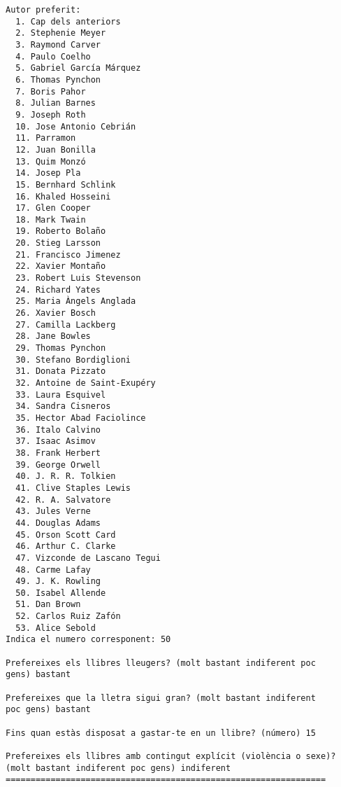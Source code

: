 \begin{verbatim}
Autor preferit: 
  1. Cap dels anteriors
  2. Stephenie Meyer
  3. Raymond Carver
  4. Paulo Coelho
  5. Gabriel García Márquez
  6. Thomas Pynchon
  7. Boris Pahor
  8. Julian Barnes
  9. Joseph Roth
  10. Jose Antonio Cebrián
  11. Parramon
  12. Juan Bonilla
  13. Quim Monzó
  14. Josep Pla
  15. Bernhard Schlink
  16. Khaled Hosseini
  17. Glen Cooper
  18. Mark Twain
  19. Roberto Bolaño
  20. Stieg Larsson
  21. Francisco Jimenez
  22. Xavier Montaño
  23. Robert Luis Stevenson
  24. Richard Yates
  25. Maria Àngels Anglada
  26. Xavier Bosch
  27. Camilla Lackberg
  28. Jane Bowles
  29. Thomas Pynchon
  30. Stefano Bordiglioni
  31. Donata Pizzato
  32. Antoine de Saint-Exupéry
  33. Laura Esquivel
  34. Sandra Cisneros
  35. Hector Abad Faciolince
  36. Italo Calvino
  37. Isaac Asimov
  38. Frank Herbert
  39. George Orwell
  40. J. R. R. Tolkien
  41. Clive Staples Lewis
  42. R. A. Salvatore
  43. Jules Verne
  44. Douglas Adams
  45. Orson Scott Card
  46. Arthur C. Clarke
  47. Vizconde de Lascano Tegui
  48. Carme Lafay
  49. J. K. Rowling
  50. Isabel Allende
  51. Dan Brown
  52. Carlos Ruiz Zafón
  53. Alice Sebold
Indica el numero corresponent: 50

Prefereixes els llibres lleugers? (molt bastant indiferent poc
gens) bastant

Prefereixes que la lletra sigui gran? (molt bastant indiferent
poc gens) bastant

Fins quan estàs disposat a gastar-te en un llibre? (número) 15

Prefereixes els llibres amb contingut explícit (violència o sexe)?
(molt bastant indiferent poc gens) indiferent
================================================================


\end{verbatim}
